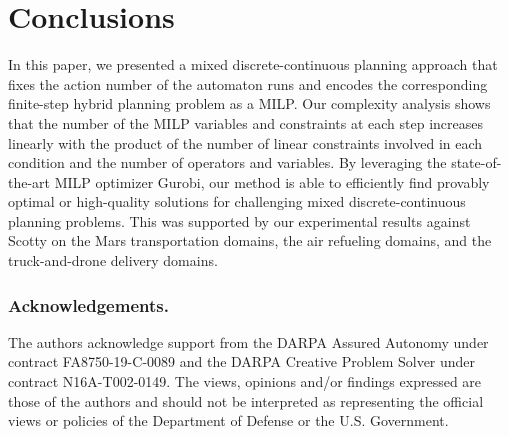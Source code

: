 \documentclass[sigconf]{acmart}
\begin{document}
\section{Conclusions}\label{section:conclusion}
In this paper, we presented a mixed discrete-continuous planning approach that fixes the action number of the automaton runs and encodes the corresponding finite-step hybrid planning problem as a MILP. Our complexity analysis shows that the number of the MILP variables and constraints at each step increases linearly with the product of the number of linear constraints involved in each condition and the number of operators and variables. By leveraging the state-of-the-art MILP optimizer Gurobi, our method is able to efficiently find provably optimal or high-quality solutions for challenging mixed discrete-continuous planning problems. This was supported by our experimental results against Scotty on the Mars transportation domains, the air refueling domains, and the truck-and-drone delivery domains.


\subsubsection*{Acknowledgements.} The authors acknowledge support from the DARPA Assured Autonomy under contract FA8750-19-C-0089 and the DARPA Creative Problem Solver under contract N16A-T002-0149. The views, opinions and/or findings expressed are those of the authors and should not be interpreted as representing the official views or policies of the Department of Defense or the U.S. Government.



\end{document}
